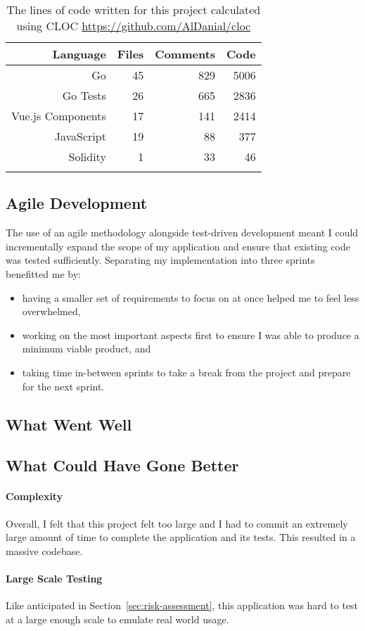 \begin{longtable}{ | r | r | r | r | }
  \hline
  \textbf{Language} & \textbf{Files} & \textbf{Comments} & \textbf{Code}
  \\\hline
  Go
  & 45
  & 829
  & 5006
  \\\hline
  Go Tests
  & 26
  & 665
  & 2836
  \\\hline
  Vue.js Components
  & 17
  & 141
  & 2414
  \\\hline
  JavaScript
  & 19
  & 88
  & 377
  \\\hline
  Solidity
  & 1
  & 33
  & 46
  \\\hline
  \caption{The lines of code written for this project calculated using CLOC \url{https://github.com/AlDanial/cloc}}
  \label{tab:cloc}
\end{longtable}

\subsection{Agile Development}

The use of an agile methodology alongside test-driven development meant I could incrementally expand the scope of my application and ensure that existing code was tested sufficiently. Separating my implementation into three sprints benefitted me by:

\begin{itemize}
  \item having a smaller set of requirements to focus on at once helped me to feel less overwhelmed,
  \item working on the most important aspects first to ensure I was able to produce a minimum viable product, and
  \item taking time in-between sprints to take a break from the project and prepare for the next sprint.
\end{itemize}



\subsection{What Went Well}



\subsection{What Could Have Gone Better}

\paragraph*{Complexity}
Overall, I felt that this project felt too large and I had to commit an extremely large amount of time to complete the application and its tests. This resulted in a massive codebase.



\paragraph*{Large Scale Testing}
Like anticipated in Section~\ref{sec:risk-assessment}, this application was hard to test at a large enough scale to emulate real world usage.
